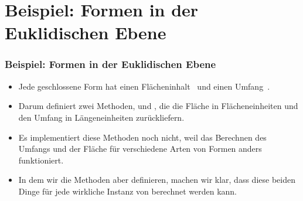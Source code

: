 \documentclass[aspectratio=169,mathserif,notheorems]{beamer}%
\begin{document}
\section{Beispiel: Formen in der Euklidischen Ebene}%
%
\begin{frame}[t]%
\frametitle{Beispiel: Formen in der Euklidischen Ebene}%
%
\begin{itemize}%
%
%
%
%
\item<3-> Jede geschlossene Form hat einen Flächeninhalt~ und einen Umfang~.%
%
\item<4-> Darum definiert  zwei Methoden,  und , die die Fläche in Flächeneinheiten und den Umfang in Längeneinheiten zurückliefern.%
%
\item<5-> Es implementiert diese Methoden noch nicht, weil das Berechnen des Umfangs und der Fläche für verschiedene Arten von Formen anders funktioniert.%
%
\item<6-> In dem wir die Methoden aber definieren, machen wir klar, dass diese beiden Dinge für jede wirkliche Instanz von  berechnet werden kann.%
%
\end{itemize}%
%
%
\end{frame}%
%
\end{document}
